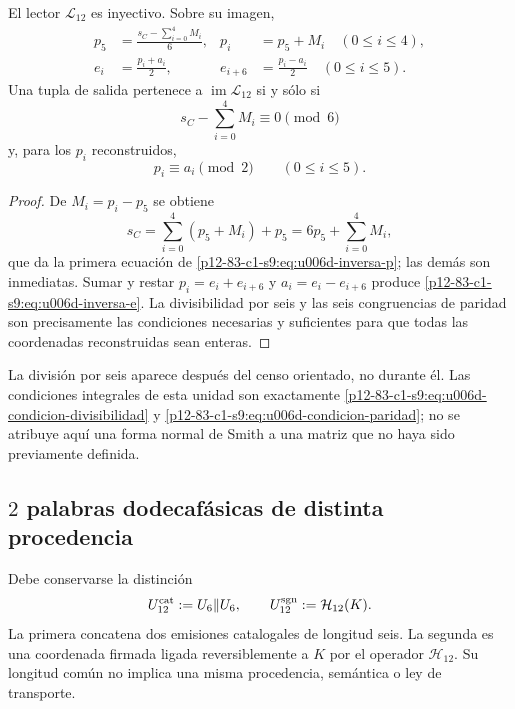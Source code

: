 {\begin{theorem}
\label{p12-83-c1-s9:thm:u006d-inversa-l12}
El lector \(\mathcal L_{12}\) es inyectivo. Sobre su imagen,
\begin{align}
 p_5&=
 \frac{s_C-\sum_{i=0}^{4}M_i}{6},
 &
 p_i&=p_5+M_i\quad(0\leq i\leq4),
 \label{p12-83-c1-s9:eq:u006d-inversa-p}\\
 e_i&=\frac{p_i+a_i}{2},
 &
 e_{i+6}&=\frac{p_i-a_i}{2}
 \quad(0\leq i\leq5).
 \label{p12-83-c1-s9:eq:u006d-inversa-e}
\end{align}
Una tupla de salida pertenece a \(\operatorname{im}\mathcal L_{12}\) si y
sólo si
\begin{equation}
 s_C-\sum_{i=0}^{4}M_i\equiv0\pmod6
 \label{p12-83-c1-s9:eq:u006d-condicion-divisibilidad}
\end{equation}
y, para los \(p_i\) reconstruidos,
\begin{equation}
 p_i\equiv a_i\pmod2
 \qquad(0\leq i\leq5).
 \label{p12-83-c1-s9:eq:u006d-condicion-paridad}
\end{equation}
\end{theorem}

\begin{proof}
De \(M_i=p_i-p_5\) se obtiene
\[
 s_C=\sum_{i=0}^{4}(p_5+M_i)+p_5
 =6p_5+\sum_{i=0}^{4}M_i,
\]
que da la primera ecuación de \eqref{p12-83-c1-s9:eq:u006d-inversa-p}; las demás son
inmediatas. Sumar y restar
\(p_i=e_i+e_{i+6}\) y \(a_i=e_i-e_{i+6}\) produce
\eqref{p12-83-c1-s9:eq:u006d-inversa-e}. La divisibilidad por seis y las seis
congruencias de paridad son precisamente las condiciones necesarias y
suficientes para que todas las coordenadas reconstruidas sean enteras.
\end{proof}

La división por seis aparece después del censo orientado, no durante él. Las
condiciones integrales de esta unidad son exactamente
\eqref{p12-83-c1-s9:eq:u006d-condicion-divisibilidad} y
\eqref{p12-83-c1-s9:eq:u006d-condicion-paridad}; no se atribuye aquí una forma normal de
Smith a una matriz que no haya sido previamente definida.

\subsection{\(2\) palabras dodecafásicas de distinta procedencia}

Debe conservarse la distinción
\begin{equation}
 U_{12}^{\rm cat}:=U_6\Vert U_6,
 \qquad
 U_{12}^{\rm sgn}:=\mathcal H_{12}(K).
 \label{p12-83-c1-s9:eq:u006d-dos-palabras-doce}
\end{equation}
La primera concatena dos emisiones catalogales de longitud seis. La segunda
es una coordenada firmada ligada reversiblemente a \(K\) por el operador
\(\mathcal H_{12}\). Su longitud común no implica una misma procedencia,
semántica o ley de transporte.

}
